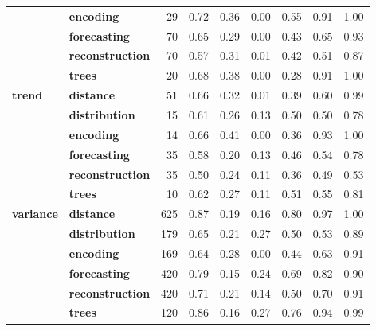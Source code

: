 \begin{table}
\begin{tabular}{llrrrrrrr}
\textbf{} & \textbf{encoding} & 29 & 0.72 & 0.36 & 0.00 & 0.55 & 0.91 & 1.00 \\
\textbf{} & \textbf{forecasting} & 70 & 0.65 & 0.29 & 0.00 & 0.43 & 0.65 & 0.93 \\
\textbf{} & \textbf{reconstruction} & 70 & 0.57 & 0.31 & 0.01 & 0.42 & 0.51 & 0.87 \\
\textbf{} & \textbf{trees} & 20 & 0.68 & 0.38 & 0.00 & 0.28 & 0.91 & 1.00 \\
\cline{1-9}
\multirow[t]{6}{*}{\textbf{trend}} & \textbf{distance} & 51 & 0.66 & 0.32 & 0.01 & 0.39 & 0.60 & 0.99 \\
\textbf{} & \textbf{distribution} & 15 & 0.61 & 0.26 & 0.13 & 0.50 & 0.50 & 0.78 \\
\textbf{} & \textbf{encoding} & 14 & 0.66 & 0.41 & 0.00 & 0.36 & 0.93 & 1.00 \\
\textbf{} & \textbf{forecasting} & 35 & 0.58 & 0.20 & 0.13 & 0.46 & 0.54 & 0.78 \\
\textbf{} & \textbf{reconstruction} & 35 & 0.50 & 0.24 & 0.11 & 0.36 & 0.49 & 0.53 \\
\textbf{} & \textbf{trees} & 10 & 0.62 & 0.27 & 0.11 & 0.51 & 0.55 & 0.81 \\
\cline{1-9}
\multirow[t]{6}{*}{\textbf{variance}} & \textbf{distance} & 625 & 0.87 & 0.19 & 0.16 & 0.80 & 0.97 & 1.00 \\
\textbf{} & \textbf{distribution} & 179 & 0.65 & 0.21 & 0.27 & 0.50 & 0.53 & 0.89 \\
\textbf{} & \textbf{encoding} & 169 & 0.64 & 0.28 & 0.00 & 0.44 & 0.63 & 0.91 \\
\textbf{} & \textbf{forecasting} & 420 & 0.79 & 0.15 & 0.24 & 0.69 & 0.82 & 0.90 \\
\textbf{} & \textbf{reconstruction} & 420 & 0.71 & 0.21 & 0.14 & 0.50 & 0.70 & 0.91 \\
\textbf{} & \textbf{trees} & 120 & 0.86 & 0.16 & 0.27 & 0.76 & 0.94 & 0.99 \\
\cline{1-9}
\bottomrule
\end{tabular}
\end{table}
